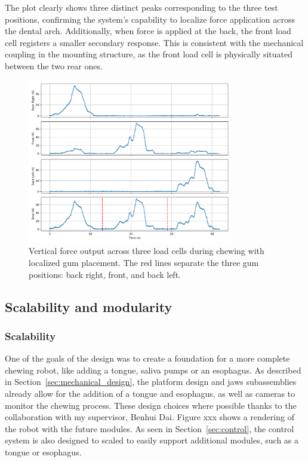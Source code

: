 The plot clearly shows three distinct peaks corresponding to the three test positions, confirming the system's capability to localize force application 
across the dental arch. Additionally, when force is applied at the back, the front load cell registers a smaller secondary response. This is consistent 
with the mechanical coupling in the mounting structure, as the front load cell is physically situated between the two rear ones.

\begin{figure}[H]
    \centering 
    \includegraphics[width=0.8\textwidth]{figures/ForceDistributionGum.png}
    \caption{Vertical force output across three load cells during chewing with localized gum placement.  
    The red lines separate the three gum positions: back right, front, and back left.}
    \label{fig:force_distribution_gum}
\end{figure}

\subsection{Scalability and modularity}
\subsubsection{Scalability} One of the goals of the design was to create a foundation for a more complete chewing robot, like adding a tongue, saliva pumps or an esophagus. 
As described in Section~\ref{sec:mechanical_design}, the platform design and jaws subassemblies already allow for the addition of a tongue and esophagus, as well as cameras 
to monitor the chewing process. These design choices where possible thanks to the collaboration with my supervisor, Benhui Dai. Figure xxx shows a rendering of the 
robot with the future modules. As seen in Section~\ref{sec:control}, the control system is also designed to scaled to easily support additional modules, such as a tongue or esophagus. 

